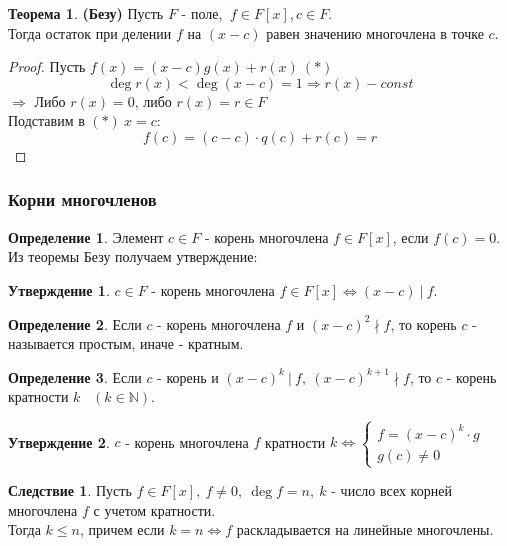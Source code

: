 \documentclass[a4paper, 12pt]{article}
\newcommand{\N}{\mathbb N}
\theoremstyle{definition}
\newtheorem*{definition}{Определение}
\newtheorem*{theorem}{Теорема}
\newtheorem*{consequense}{Следствие}
\newtheorem*{subtheorem}{Утверждение}
\begin{document}
  \begin{theorem}\textbf{(Безу)} 
    Пусть $F$ - поле, $ \ f \in F[x], c \in F$.\\
    Тогда остаток при делении $f$ на $(x-c)$ равен значению многочлена в точке $c$.     
  \end{theorem}
  \begin{proof}
    Пусть $f(x) = (x-c)g(x) + r(x)\  (*)$
    $$\deg r(x) < \deg (x-c) = 1 \Longrightarrow  r(x) - const$$
    $\Longrightarrow $ Либо $r(x) = 0$, либо $r(x)=r \in F$\\
    Подставим в $(*) \ x = c$:
    $$f(c) = (c-c)\cdot q(c) + r(c) = r$$
  \end{proof}   
  \subsubsection{Корни многочленов}
  \begin{definition}
    Элемент $c\in F$ - корень многочлена $f \in F[x]$, если $f(c) = 0$. Из теоремы Безу получаем утверждение: 
  \end{definition}
  \begin{subtheorem}
    $c \in F$ - корень многочлена $f\in F[x] \Longleftrightarrow (x-c) \ | \ f$.  
  \end{subtheorem}  
  \begin{definition}
    Если $c$ - корень многочлена $f$ и $(x-c)^2 \nmid f$, то корень $c$ - называется простым, иначе - кратным.
  \end{definition} 
  \begin{definition}
    Если $c$ - корень и $(x-c)^k \ | \ f, \ (x-c)^{k+1} \nmid f$, то $c$ - корень кратности $k$ \ $(k \in \N)$.     
  \end{definition} 
  \begin{subtheorem}
    $c$ - корень многочлена $f$ кратности $k \Longleftrightarrow \begin{cases}
      f = (x-c)^k \cdot g\\
      g(c) \neq 0
    \end{cases}$  
  \end{subtheorem} 
  \begin{consequense}
    Пусть $f \in F[x], \ f \neq 0, \ \deg f = n, \ k$ - число всех корней многочлена $f$ с учетом кратности. \\
    Тогда $k\leq n$, причем если $k=n \Longleftrightarrow f$ раскладывается на линейные многочлены.    
  \end{consequense}
\end{document}
